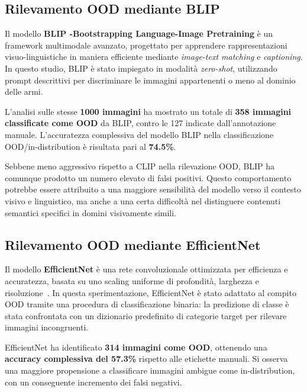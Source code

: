 \subsection{Rilevamento OOD mediante BLIP}
\label{sec:ood-blip}

Il modello \textbf{BLIP -Bootstrapping Language-Image Pretraining } è un framework multimodale avanzato, progettato per apprendere rappresentazioni visuo-linguistiche in maniera efficiente mediante \textit{image-text matching} e \textit{captioning}. In questo studio, BLIP è stato impiegato in modalità \textit{zero-shot}, utilizzando prompt descrittivi per discriminare le immagini appartenenti o meno al dominio delle armi.

L’analisi sulle stesse \textbf{1000 immagini} ha mostrato un totale di \textbf{358 immagini classificate come OOD} da BLIP, contro le 127 indicate dall’annotazione manuale. L’accuratezza complessiva del modello BLIP nella classificazione OOD/in-distribution è risultata pari al \textbf{74.5\%}.

\medskip

Sebbene meno aggressivo rispetto a CLIP nella rilevazione OOD, BLIP ha comunque prodotto un numero elevato di falsi positivi. Questo comportamento potrebbe essere attribuito a una maggiore sensibilità del modello verso il contesto visivo e linguistico, ma anche a una certa difficoltà nel distinguere contenuti semantici specifici in domini visivamente simili.




\subsection{Rilevamento OOD mediante EfficientNet}
\label{sec:ood-efficientnet}

Il modello \textbf{EfficientNet} è una rete convoluzionale ottimizzata per efficienza e accuratezza, basata su uno scaling uniforme di profondità, larghezza e risoluzione~\cite{tan2019efficientnet}. In questa sperimentazione, EfficientNet è stato adattato al compito OOD tramite una procedura di classificazione binaria: la predizione di classe è stata confrontata con un dizionario predefinito di categorie target per rilevare immagini incongruenti.

EfficientNet ha identificato \textbf{314 immagini come OOD}, ottenendo una \textbf{accuracy complessiva del 57.3\%} rispetto alle etichette manuali. Si osserva una maggiore propensione a classificare immagini ambigue come in-distribution, con un conseguente incremento dei falsi negativi.

